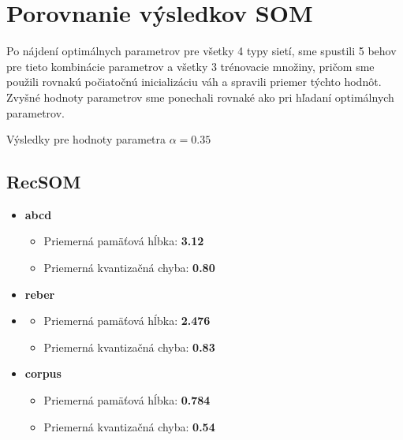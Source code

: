 

\section {Porovnanie výsledkov SOM}
Po nájdení optimálnych parametrov pre všetky 4 typy sietí, sme spustili 5 behov pre tieto kombinácie parametrov a všetky 3 trénovacie množiny,
pričom sme použili rovnakú počiatočnú inicializáciu váh a spravili priemer týchto hodnôt. Zvyšné hodnoty parametrov sme ponechali
rovnaké ako pri hľadaní optimálnych parametrov.

Výsledky pre hodnoty parametra $\alpha = 0.35$
\subsection{RecSOM}
\begin{itemize}
    \item \textbf{abcd}
    \begin{itemize}
        \item Priemerná pamäťová hĺbka: \textbf{3.12}
        \item Priemerná kvantizačná chyba: \textbf{0.80}
    \end{itemize}
    \item \textbf{reber}
    \item \begin{itemize}
        \item Priemerná pamäťová hĺbka: \textbf{2.476}
        \item Priemerná kvantizačná chyba: \textbf{0.83}
    \end{itemize}
    \item \textbf{corpus}
    \begin{itemize}
        \item Priemerná pamäťová hĺbka: \textbf{0.784}
        \item Priemerná kvantizačná chyba: \textbf{0.54}
    \end{itemize}
\end{itemize}

